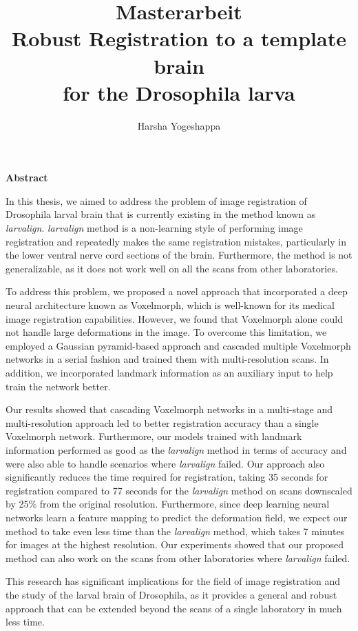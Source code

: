 \documentclass{book}
\title{
	Masterarbeit \\
	Robust Registration to a template brain  \\
	for the Drosophila larva \large }
\author{Harsha Yogeshappa}
\begin{document}
	\maketitle
	
	\vspace*{\fill}
	\begin{center}
		{\Large \textcolor{rwth-blue-1}{\textbf{Abstract}}}
	\end{center}
	In this thesis, we aimed to address the problem of image registration of Drosophila larval brain that is currently existing in the method known as \textit{larvalign}. \textit{larvalign} method is a non-learning style of performing image registration and repeatedly makes the same registration mistakes, particularly in the lower ventral nerve cord sections of the brain. Furthermore, the method is not generalizable, as it does not work well on all the scans from other laboratories.
	
	To address this problem, we proposed a novel approach that incorporated a deep neural architecture known as Voxelmorph, which is well-known for its medical image registration capabilities. However, we found that Voxelmorph alone could not handle large deformations in the image. To overcome this limitation, we employed a Gaussian pyramid-based approach and cascaded multiple Voxelmorph networks in a serial fashion and trained them with multi-resolution scans. In addition, we incorporated landmark information as an auxiliary input to help train the network better.
	
	Our results showed that cascading Voxelmorph networks in a multi-stage and multi-resolution approach led to better registration accuracy than a single Voxelmorph network. Furthermore, our models trained with landmark information performed as good as the \textit{larvalign} method in terms of accuracy and were also able to handle scenarios where \textit{larvalign} failed. Our approach also significantly reduces the time required for registration, taking 35 seconds for registration compared to 77 seconds for the \textit{larvalign} method on scans downscaled by 25\% from the original resolution. Furthermore, since deep learning neural networks learn a feature mapping to predict the deformation field, we expect our method to take even less time than the \textit{larvalign} method, which takes 7 minutes for images at the highest resolution. Our experiments showed that our proposed method can also work on the scans from other laboratories where \textit{larvalign} failed.
	
	This research has significant implications for the field of image registration and the study of the larval brain of Drosophila, as it provides a general and robust approach that can be extended beyond the scans of a single laboratory in much less time.
	\vspace*{\fill}
	
\end{document}
